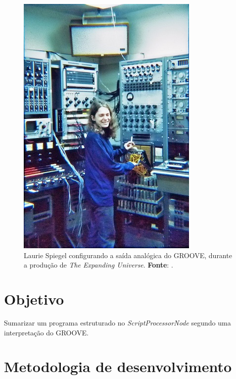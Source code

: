 \begin{figure}[!h]
  \begin{center}
  \includegraphics[scale=0.5]{./spiegel.jpg}
  \caption{\small Laurie Spiegel configurando a saída analógica do GROOVE, durante a produção de \emph{The Expanding Universe}. \textbf{Fonte}: \cite{spiegel_expanding_1975}.}
  \label{fig:groove}
  \end{center}
\end{figure}

\section{Objetivo}

\normalsize Sumarizar um programa estruturado no \emph{ScriptProcessorNode} segundo uma interpretação do GROOVE.


\section{Metodologia de desenvolvimento}


